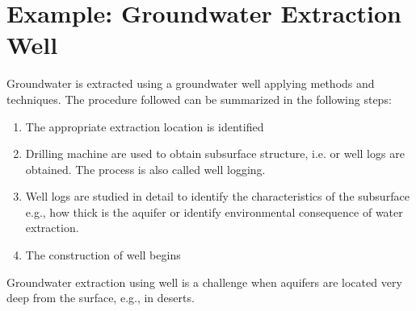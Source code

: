 \documentclass[letterpaper,10pt,english]{jupyterBook}
\begin{document}
\section{Example: Groundwater Extraction Well}
\label{\detokenize{content/background/03_basic_hydrogeology:example-groundwater-extraction-well}}
\sphinxAtStartPar
Groundwater is extracted using a groundwater well applying  methods and techniques. The procedure followed can be summarized in the following steps:
\begin{enumerate}
%
\item {} 
\sphinxAtStartPar
The appropriate extraction location is identified

\item {} 
\sphinxAtStartPar
Drilling machine are used to obtain sub\sphinxhyphen{}surface structure, i.e. or well logs are obtained. The process is also called well logging.

\item {} 
\sphinxAtStartPar
Well logs are studied in detail to identify the characteristics of the subsurface\sphinxhyphen{} e.g., how thick is the aquifer or identify environmental consequence of water extraction.

\item {} 
\sphinxAtStartPar
The construction of well begins

\end{enumerate}

\sphinxAtStartPar
Groundwater extraction using well is a challenge when aquifers are located very deep from the surface, e.g., in deserts.
\end{document}
